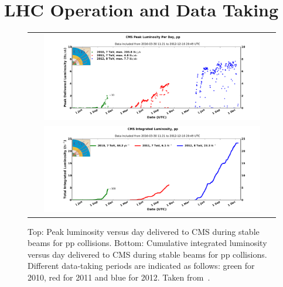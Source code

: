 \section{LHC Operation and Data Taking}
\label{sec:data}
\begin{figure}[!tp]
  \centering
  \begin{tabular}{c}
    \includegraphics[width=0.9\textwidth]{figures/peak_lumi_pp.pdf} \\
    \includegraphics[width=0.9\textwidth]{figures/int_lumi_cumulative_pp_1.pdf}
  \end{tabular}
  \caption{Top: Peak luminosity versus day delivered to CMS during stable beams for pp collisions. Bottom: Cumulative integrated luminosity versus day delivered to CMS during stable beams for pp collisions. Different data-taking periods are indicated as follows: green for 2010, red for 2011 and blue for 2012. Taken from~\cite{bib:lhc:lumi12}.}
  \label{fig:lhc_data}
\end{figure}
